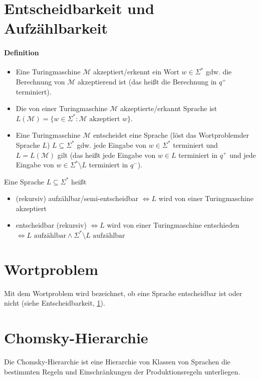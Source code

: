 \section{Entscheidbarkeit und Aufzählbarkeit}
    \label{entscheidbarkeit}
    \paragraph{Definition}
        \begin{itemize}
            \item Eine Turingmaschine $ \mathcal{M} $ akzeptiert/erkennt ein Wort $ w \in \Sigma ^ * $ gdw. die Berechnung von $ \mathcal{M} $ akzeptierend ist (das heißt die Berechnung in $ q ^ + $ terminiert).
            \item Die von einer Turingmaschine $ \mathcal{M} $ akzeptierte/erkannt Sprache ist $ L(\mathcal{M}) = \{ w \in \Sigma ^ * : \mathcal{M} \text{ akzeptiert } w \} $.
            \item Eine Turingmaschine $ \mathcal{M} $ entscheidet eine Sprache (löst das Wortproblemder Sprache $ L $) $ L \subseteq \Sigma ^ * $ gdw. jede Eingabe von $ w \in \Sigma ^ * $ terminiert und $ L = L(\mathcal{M}) $ gilt (das heißt jede Eingabe von $ w \in L $ terminiert in $ q ^ + $ und jede Eingabe von $ w \in \Sigma ^ * \setminus L $ terminiert in $ q ^ - $).
        \end{itemize}

        Eine Sprache $ L \subseteq \Sigma ^ * $ heißt
        \begin{itemize}
            \item (rekursiv) aufzählbar/semi-entscheidbar $ \iff L $ wird von einer Turingmaschine akzeptiert
            \item entscheidbar (rekursiv) $ \iff L $ wird von einer Turingmaschine entschieden $ \iff L \text{ aufzählbar} \land \Sigma ^ * \setminus L \text{ aufzählbar} $
        \end{itemize}


\section{Wortproblem}
    Mit dem Wortproblem wird bezeichnet, ob eine Sprache entscheidbar ist oder nicht (siehe Entscheidbarkeit, \ref{entscheidbarkeit}).


\section{Chomsky-Hierarchie}
    Die Chomsky-Hierarchie ist eine Hierarchie von Klassen von Sprachen die bestimmten Regeln und Einschränkungen der Produktionsregeln unterliegen.

